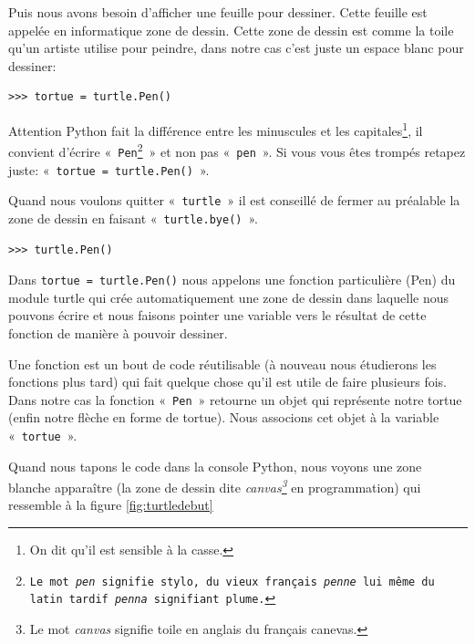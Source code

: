 Puis nous avons besoin d'afficher une feuille pour dessiner. Cette feuille est appelée en informatique zone de dessin. Cette zone de dessin est comme la toile qu'un artiste utilise pour peindre, dans notre cas c'est juste un espace blanc pour dessiner:

\begin{Verbatim}[frame=single,rulecolor=\color{mbleu}, label=à taper]
>>> tortue = turtle.Pen()
\end{Verbatim}

Attention Python fait la différence entre les minuscules et les capitales\footnote{On dit qu'il est sensible à la casse.}, il convient d'écrire «~\texttt{Pen\footnote{Le mot \emph{pen} signifie stylo, du vieux français \emph{penne} lui même du latin tardif \emph{penna} signifiant plume.
}}~»  et non pas «~\texttt{pen}~». Si vous vous êtes trompés retapez juste: «~\texttt{tortue = turtle.Pen()}~».


Quand nous voulons quitter «~\texttt{turtle}~» il est conseillé de fermer au préalable la zone de dessin en faisant «~\texttt{turtle.bye()}~».

\begin{Verbatim}[frame=single,rulecolor=\color{mbleu}, label=à taper]
>>> turtle.Pen()
\end{Verbatim}


Dans \verb+tortue = turtle.Pen()+ nous appelons une fonction particulière (Pen) du module turtle qui crée automatiquement une zone de dessin dans laquelle nous pouvons écrire et nous faisons pointer une variable vers le résultat de cette fonction de manière à pouvoir dessiner.

Une fonction est un bout de code réutilisable (à nouveau nous étudierons  les fonctions plus tard) qui fait quelque chose qu'il est utile de faire plusieurs fois. Dans notre cas la fonction «~\texttt{Pen}~» retourne un objet qui 
représente notre tortue (enfin notre flèche en forme de tortue). Nous associons cet objet à la variable «~\texttt{tortue}~».

Quand nous tapons le code dans la console Python, nous voyons une zone blanche apparaître (la zone de dessin dite \emph{canvas\footnote{Le mot \emph{canvas} signifie toile en anglais du français canevas.}} en programmation) qui ressemble à la figure \ref{fig:turtledebut}

